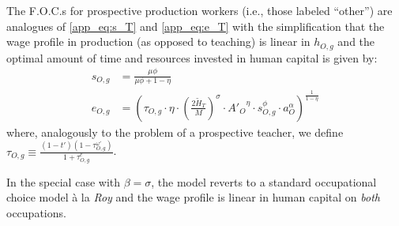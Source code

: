 \documentclass[onehalfspacing,11pt]{article}
\begin{document}
	The F.O.C.s for prospective production workers (i.e., those labeled ``other'') are analogues of \eqref{app_eq:s_T} and \eqref{app_eq:e_T} with the simplification that the wage profile in production (as opposed to teaching) is linear in $h_{O,g}$ and the optimal amount of time and resources invested in human capital is given by:
	\begin{align}
		s_{O,g} & = \frac{\mu \phi}{\mu \phi+1-\eta} \\
		\label{eq:e_O_app}
		e_{O,g} & = \left( \tau_{O,g} \cdot \eta \cdot \left(\tfrac{2\widetilde{H}_T}{M}\right)^\sigma\cdot {A'_{O}}^\eta \cdot s_{O,g}^\phi \cdot a_O^\alpha \right)^{\frac{1}{1-\eta}}
	\end{align}
	where, analogously to the problem of a prospective teacher, we define $\tau_{O,g} \equiv \frac{\left( 1-t' \right) \left( 1-\tau^{\omega '}_{O,g} \right)}{1+\tau^e_{O,g}}$.
	
	In the special case with $\beta=\sigma$, the model reverts to a standard occupational choice model \`a la {\it Roy} and the wage profile is linear in human capital on {\it both} occupations.
	
\end{document}

